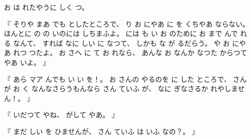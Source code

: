 %
お
は
れたやうに
しく
つ。

%
『
そりや
まあ
でも
としたところで、
%
り
お
にやあ
に
を
くちやあ
ならない。
%
ほんとに
の
の
いのには
しちまふよ。
%
には
も
い
お
のために
お
%
まで
んで
れる
なんて、
%
すれば
なに
しい
に
なつて、
%
しかも
な
が
るだらう。
%
や
お
にやあ
れつ
つたよ。
%
お
さへ
に
て
お
れなら、
%
あんな
お
なんか
なつた
からつて
やあ
いよ。
』

%
『
あら
マア
んでも
い
い
を！。
%
お
さんの
やるのを
に
した
ところで、
%
さんが
お
く
なんなさらうもんなら
さん
ていふ
が、
%
なに
ぎなさるか
れやしません！。
』

%
『
いだつて
やね、%
%
がして
やあ。
』

%
『
まだ
しい
を
ひませんが、%
%
さん
ていふ
は
いふ
なの？。
』

